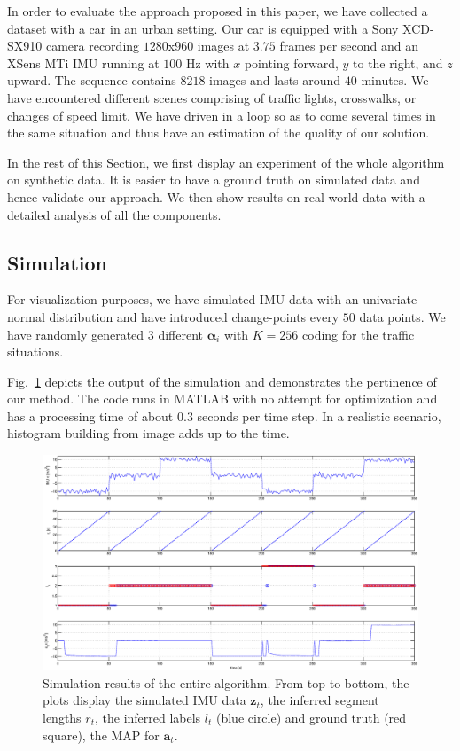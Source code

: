 In order to evaluate the approach proposed in this paper, we have collected
a dataset with a car in an urban setting. Our car is equipped with a Sony
XCD-SX910 camera recording $1280$x$960$ images at $3.75$ frames per second and
an XSens MTi IMU running at $100$ Hz with $x$ pointing forward, $y$ to the
right, and $z$ upward. The sequence contains $8218$ images and lasts around $40$
minutes. We have encountered different scenes comprising of traffic lights,
crosswalks, or changes of speed limit. We have driven in a loop so as to come
several times in the same situation and thus have an estimation of the quality
of our solution.

In the rest of this Section, we first display an experiment of the whole
algorithm on synthetic data. It is easier to have a ground truth on simulated
data and hence validate our approach. We then show results on real-world data
with a detailed analysis of all the components.

\subsection{Simulation}
For visualization purposes, we have simulated IMU data with an univariate normal
distribution and have introduced change-points every $50$ data points. We have
randomly generated 3 different $\boldsymbol{\alpha}_i$ with $K=256$ coding for
the traffic situations.

Fig.~\ref{fig:simulation} depicts the output of the simulation and demonstrates
the pertinence of our method. The code runs in MATLAB with no attempt for
optimization and has a processing time of about $0.3$ seconds per time step. In
a realistic scenario, histogram building from image adds up to the time.

\begin{figure}[t]
\centering
\includegraphics[width=\columnwidth]{fig/simResult.eps}
\caption{Simulation results of the entire algorithm. From top to bottom, the
plots display the simulated IMU data $\mathbf{z}_t$, the inferred segment
lengths $r_t$, the inferred labels $l_t$ (blue circle) and ground truth
(red square), the MAP for $\mathbf{a}_t$.}
\label{fig:simulation}
\end{figure}

